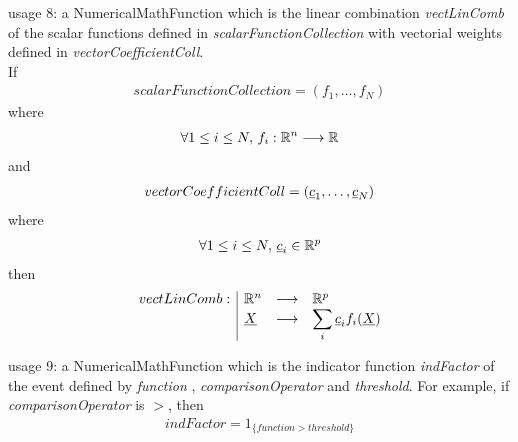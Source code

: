 \begin{description}
\begin{description}
\item usage 8:   a NumericalMathFunction which is the linear combination \textit{vectLinComb} of the scalar functions defined in  \textit{scalarFunctionCollection} with vectorial weights defined in \textit{vectorCoefficientColl}. \\
If
\begin{align*}
scalarFunctionCollection = (f_1, \hdots, f_N)
\end{align*}
where
\begin{align*}
\forall 1 \leq i \leq N, \,     f_i: {\mathbb R}^n \longrightarrow {\mathbb R}
\end{align*}
and
\begin{align*}
vectorCoefficientColl = ({\underline{c}}_1, \hdots, {\underline{c}}_N)
\end{align*}
where
\begin{align*}
\forall 1 \leq i \leq N, \,   {\underline{c}}_i \in {\mathbb R}^p
\end{align*}
then
\begin{align*}
\begin{array}{l|lcl}
vectLinComb: & {\mathbb R}^n & \longrightarrow & {\mathbb R}^{p} \\
&  {\underline{X}} & \longrightarrow & \displaystyle \sum_i {\underline{c}}_if_i ({\underline{X}})
\end{array}
\end{align*}

\item usage 9:   a NumericalMathFunction which is the indicator function \textit{indFactor} of the event defined by \textit{function} , \textit{comparisonOperator} and \textit{threshold}. For example, if \textit{comparisonOperator} is $>$, then
\begin{align*}
indFactor = 1_{\{function > threshold\}}
\end{align*}
\end{description}

\item[Some methods:]  \rule{0pt}{1em}
\begin{description}


\end{description}
\end{description}
